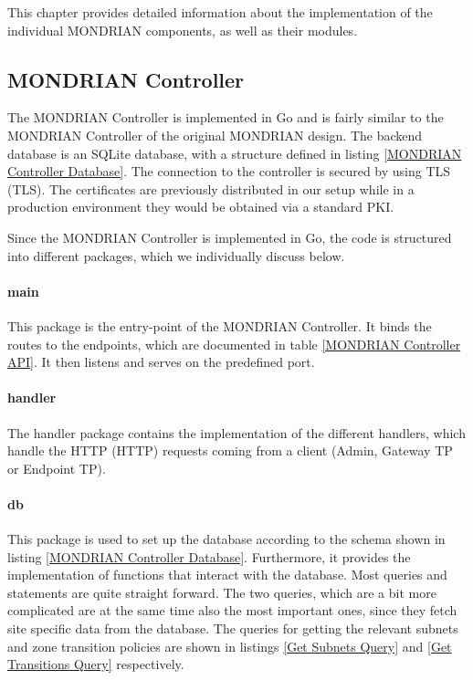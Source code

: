 This chapter provides detailed information about the implementation of the individual MONDRIAN components, as well as their modules.

\subsection{MONDRIAN Controller}
The MONDRIAN Controller is implemented in Go and is fairly similar to the MONDRIAN Controller of the original MONDRIAN design. The backend database is an SQLite database, with a structure defined in listing \ref{MONDRIAN Controller Database}. The connection to the controller is secured by using \acs{TLS} (\acl{TLS}). The certificates are previously distributed in our setup while in a production environment they would be obtained via a standard \acs{PKI}.

Since the MONDRIAN Controller is implemented in Go, the code is structured into different packages, which we individually discuss below.

\paragraph{main} This package is the entry-point of the MONDRIAN Controller. It binds the routes to the endpoints, which are documented in table \ref{MONDRIAN Controller API}. It then listens and serves on the predefined port.
\paragraph{handler} The handler package contains the implementation of the different handlers, which handle the \acs{HTTP} (\acl{HTTP}) requests coming from a client (Admin, Gateway \acs{TP} or Endpoint \acs{TP}).
\paragraph{db} This package is used to set up the database according to the schema shown in listing \ref{MONDRIAN Controller Database}. Furthermore, it provides the implementation of functions that interact with the database. Most queries and statements are quite straight forward. The two queries, which are a bit more complicated are at the same time also the most important ones, since they fetch site specific data from the database. The queries for getting the relevant subnets and zone transition policies are shown in listings \ref{Get Subnets Query} and \ref{Get Transitions Query} respectively.
